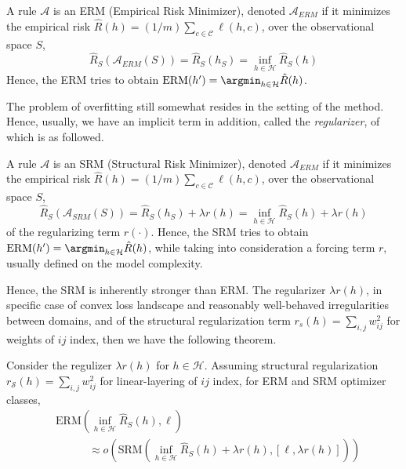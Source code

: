 \documentclass[
  journal=largetwo,
  year=2025,
  volume=37,
]{cup-journal}
\begin{document}
\begin{definition}
    A rule $\mathcal{A}$ is an ERM (Empirical Risk Minimizer), denoted $\mathcal{A}_{ERM}$ if it minimizes the empirical risk $\hat{R}(h)=(1/m)\sum_{c\in\mathcal{C}}\ell(h,c)$, over the observational space $S$, 
    \begin{equation}
        \hat{R}_{S}(\mathcal{A}_{ERM}(S)) = \hat{R}_{S} (h_{S}) = \inf_{h\in\mathcal{H}} \hat{R}_{S}(h) 
    \end{equation}
    Hence, the ERM tries to obtain $\mathrm{ERM}(h') = \argmin_{h\in \mathcal{H}} \hat{R}(h)$. 
\end{definition}

The problem of overfitting still somewhat resides in the setting of the method. Hence, usually, we have an implicit term in addition, called the \textit{regularizer}, of which is as followed. 

\begin{definition}
    A rule $\mathcal{A}$ is an SRM (Structural Risk Minimizer), denoted $\mathcal{A}_{ERM}$ if it minimizes the empirical risk $\hat{R}(h)=(1/m)\sum_{c\in\mathcal{C}}\ell(h,c)$, over the observational space $S$, 
    \begin{equation}
        \hat{R}_{S}(\mathcal{A}_{SRM}(S)) = \hat{R}_{S} (h_{S}) + \lambda r(h)= \inf_{h\in\mathcal{H}} \hat{R}_{S}(h) + \lambda r(h)
    \end{equation}
    of the regularizing term $r(\cdot)$. Hence, the SRM tries to obtain $\mathrm{ERM}(h') = \argmin_{h\in \mathcal{H}} \hat{R}(h)$, while taking into consideration a forcing term $r$, usually defined on the model complexity. 
\end{definition}

Hence, the SRM is inherently stronger than ERM. The regularizer $\lambda r(h)$, in specific case of convex loss landscape and reasonably well-behaved irregularities between domains, and of the structural regularization term $r_{s}(h)=\sum_{i,j}w_{ij}^{2}$ for weights of $ij$ index, then we have the following theorem. 

\begin{conjecture}
    Consider the regulizer $\lambda r(h)$ for $h\in\mathcal{H}$. Assuming structural regularization $r_{\mathcal{S}}(h)=\sum_{i,j}w_{ij}^{2}$ for linear-layering of $ij$ index, for ERM and SRM optimizer classes, 
    \begin{equation}
    \begin{split}
        &\mathrm{ERM}\left(\inf_{h\in\mathcal{H}} \hat{R}_{S}(h), \ell\right)\\
        &\quad \quad \quad \approx o\left(\mathrm{SRM}\left(\inf_{h\in\mathcal{H}} \hat{R}_{S}(h) + \lambda r(h), [\ell ,\lambda r(h)]\right)\right)
    \end{split}
\end{equation}
\end{conjecture}
\end{document}
